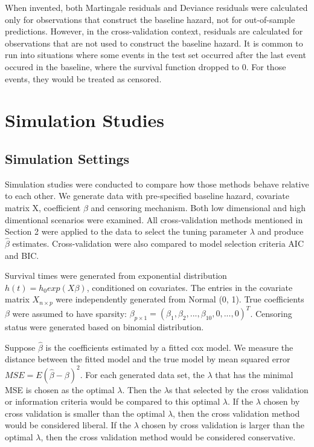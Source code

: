 \documentclass{article}\usepackage[]{graphicx}\usepackage[]{color}
\begin{document}
When invented, both Martingale residuals and Deviance residuals were calculated only for observations that construct the baseline hazard, not for out-of-sample predictions. However, in the cross-validation context, residuals are calculated for observations that are not used to construct the baseline hazard. It is common to run into situations where some events in the test set occurred after the last event occured in the baseline, where the survival function dropped to 0. For those events, they would be treated as censored.

\section{Simulation Studies}

  \subsection{Simulation Settings}
  
  Simulation studies were conducted to compare how those methods behave relative to each other. We generate data with pre-specified baseline hazard, covariate matrix X, coefficient $\beta$ and censoring mechanism. Both low dimensional and high dimentional scenarios were examined. All cross-validation methods mentioned in Section 2 were applied to the data to select the tuning parameter $\lambda$ and produce $\hat{\beta}$ estimates. Cross-validation were also compared to model selection criteria AIC and BIC.
  
  Survival times were generated from exponential distribution $h(t) = h_{0} exp(X\beta)$, conditioned on covariates. The entries in the covariate matrix $X_{n \times p}$ were independently generated from Normal (0, 1). True coefficients $\beta$  were assumed to have sparsity: $\beta_{p\times 1} = (\beta_{1},\beta_{2}, ..., \beta_{10}, 0, ..., 0)^{T}$.  Censoring status were generated based on binomial distribution.
  
  Suppose $\hat{\beta}$ is the coefficients estimated by a fitted cox model. We measure the distance between the fitted model and the true model by mean squared error $MSE = E(\hat{\beta} - \beta)^2$. For each generated data set, the $\lambda$ that has the minimal MSE is chosen as the optimal $\lambda$. Then the $\lambda$s that selected by the cross validation or information criteria would be compared to this optimal $\lambda$. If the $\lambda$ chosen by cross validation is smaller than the optimal $\lambda$, then the cross validation method would be considered liberal. If the $\lambda$ chosen by cross validation is larger than the optimal $\lambda$, then the cross validation method would be considered conservative. 
  
\end{document}
